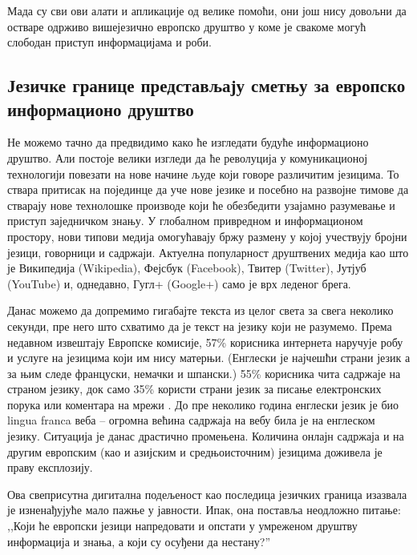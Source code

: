 \begin{multicols}{2}
Мада су сви ови алати и апликације од велике помоћи, они још нису довољни да остваре одрживо вишејезично европско друштво у коме је свакоме могућ слободан приступ информацијама и роби.
 
\subsection {Језичке границе представљају сметњу за европско информационо друштво}
  
Не можемо тачно да предвидимо како ће изгледати будуће информационо друштво. Али постоје велики изгледи да ће револуција у комуникационој технологији повезати на нове начине људе који говоре различитим језицима. То ствара притисак на појединце да уче нове језике и посебно на развојне тимове да стварају нове технолошке производе који ће обезбедити узајамно разумевање и приступ заједничком знању. У глобалном привредном и информационом простору, нови типови медија омогућавају бржу размену у којој учествују бројни језици, говорници и садржаји. Актуелна популарност друштвених медија као што је Википедија (Wikipedia), Фејсбук (Facebook), Твитер (Twitter), Јутјуб (YouTube) и, однедавно, Гугл+ (Google+) само је  врх леденог брега. 


Данас можемо да допремимо гигабајте текста из целог света за свега неколико секунди, пре него што схватимо да је текст на језику који не разумемо. Према недавном извештају Европске комисије, 57\% корисника интернета наручује робу и услуге на језицима који им нису матерњи. (Енглески је најчешћи страни језик а за њим следе француски, немачки и шпански.) 55\% корисника чита садржаје на страном језику, док само 35\% користи страни језик за писање електронских порука или коментара на мрежи  \cite{EC1}. До пре неколико година енглески језик је био lingua franca веба -- огромна већина садржаја на вебу била је на енглеском језику.  Ситуација је данас драстично промењена. Количина онлајн садржаја и на другим европским (као и азијским и средњоисточним) језицима доживела је праву експлозију. 

Ова свеприсутна дигитална подељеност као последица језичких граница изазвала је изненађујуће мало пажње у јавности. Ипак, она поставља неодложно питање: ,,Који ће европски језици напредовати и опстати у умреженом друштву информација и знања, а који су осуђени да нестану?''
 

\end{multicols}
